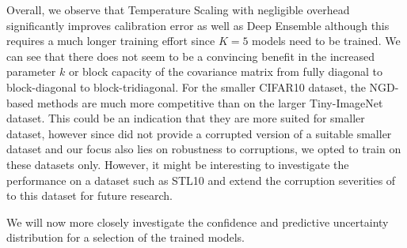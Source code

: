 \documentclass[a4paper, 11pt, oneside]{scrartcl}
\theoremstyle{break}
\numberwithin{equation}{section}
\begin{document}
		Overall, we observe that Temperature Scaling with negligible overhead significantly improves calibration error as well as Deep Ensemble although this requires a much longer training effort since $K = 5$ models need to be trained. 
		We can see that there does not seem to be a convincing benefit in the increased parameter $k$ or block capacity of the covariance matrix from fully diagonal to block-diagonal to block-tridiagonal.
		For the smaller CIFAR10 dataset, the NGD-based methods are much more competitive than on the larger Tiny-ImageNet dataset. 
		This could be an indication that they are more suited for smaller dataset, however since \parencite{HD19} did not provide a corrupted version of a suitable smaller dataset and our focus also lies on robustness to corruptions, we opted to train on these datasets only. 
		However, it might be interesting to investigate the performance on a dataset such as STL10 \parencite{CNL11} and extend the corruption severities of \parencite{HD19} to this dataset for future research.

		We will now more closely investigate the confidence and predictive uncertainty distribution for a selection of the trained models. 
\end{document}
